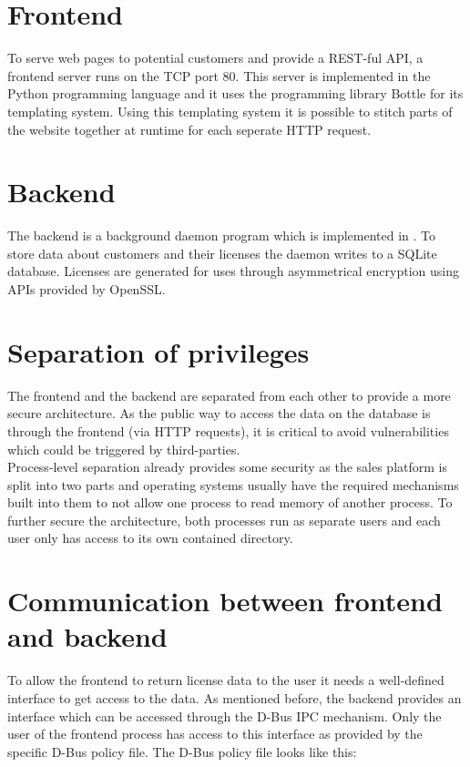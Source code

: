 \section{Frontend}
To serve web pages to potential customers and provide a REST-ful API, a frontend server runs on the TCP port 80. This server is implemented in the Python programming language and it uses the programming library Bottle for its templating system. Using this templating system it is possible to stitch parts of the website together at runtime for each seperate HTTP request.

\section{Backend}
The backend is a background daemon program which is implemented in \cpp. To store data about customers and their licenses the daemon writes to a SQLite database. Licenses are generated for uses through asymmetrical encryption using APIs provided by OpenSSL.

\section{Separation of privileges}
The frontend and the backend are separated from each other to provide a more secure architecture. As the public way to access the data on the database is through the frontend (via HTTP requests), it is critical to avoid vulnerabilities which could be triggered by third-parties. 
\\
Process-level separation already provides some security as the sales platform is split into two parts and operating systems usually have the required mechanisms built into them to not allow one process to read memory of another process. To further secure the architecture, both processes run as separate users and each user only has access to its own contained directory.

\section{Communication between frontend and backend}
To allow the frontend to return license data to the user it needs a well-defined interface to get access to the data. As mentioned before, the backend provides an interface which can be accessed through the D-Bus IPC mechanism. Only the user of the frontend process has access to this interface as provided by the specific D-Bus policy file. The D-Bus policy file looks like this:

